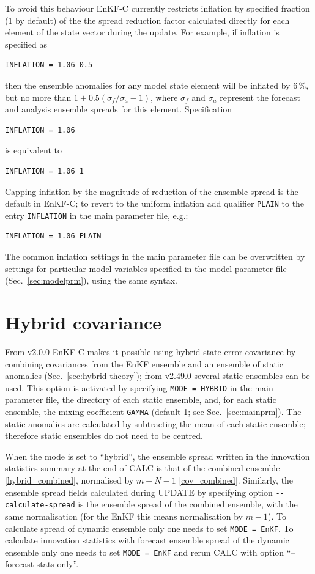 \documentclass[11pt]{report}
\begin{document}
To avoid this behaviour EnKF-C currently restricts inflation by specified fraction (1 by default) of the the spread reduction factor calculated directly for each element of the state vector during the update.
For example, if inflation is specified as
\begin{Verbatim}
INFLATION = 1.06 0.5
\end{Verbatim}
then the ensemble anomalies for any model state element will be inflated by 6\,\%, but no more than $1 + 0.5 (\sigma_f / \sigma_a - 1)$, where $\sigma_f$ and $\sigma_a$ represent the forecast and analysis ensemble spreads for this element.
Specification
\begin{Verbatim}
INFLATION = 1.06
\end{Verbatim}
is equivalent to
\begin{Verbatim}
INFLATION = 1.06 1
\end{Verbatim}
Capping inflation by the magnitude of reduction of the ensemble spread is the default in EnKF-C; to revert to the uniform inflation add qualifier \verb|PLAIN| to the entry \verb|INFLATION| in the main parameter file, e.g.:
\begin{Verbatim}
INFLATION = 1.06 PLAIN
\end{Verbatim}
The common inflation settings in the main parameter file can be overwritten by settings for particular model variables specified in the model parameter file (Sec.~\ref{sec:modelprm}), using the same syntax.

\section{Hybrid covariance}
\label{sec:hybrid-enkfc}

From v2.0.0 EnKF-C makes it possible using hybrid state error covariance by combining covariances from the EnKF ensemble and an ensemble of static anomalies (Sec.~\ref{sec:hybrid-theory}); from v2.49.0 several static ensembles can be used.
This option is activated by specifying \verb|MODE = HYBRID| in the main parameter file, the directory of each static ensemble, and, for each static ensemble, the mixing coefficient \verb|GAMMA| (default 1; see Sec.~\ref{sec:mainprm}).
The static anomalies are calculated by subtracting the mean of each static ensemble; therefore static ensembles do not need to be centred.

When the mode is set to ``hybrid'', the ensemble spread written in the innovation statistics summary at the end of CALC is that of the combined ensemble \eqref{hybrid_combined}, normalised by $m - N - 1$ \eqref{cov_combined}.
Similarly, the ensemble spread fields calculated during UPDATE by specifying option \verb|--calculate-spread| is the ensemble spread of the combined ensemble, with the same normalisation (for the EnKF this means normalisation by $m - 1$).
To calculate spread of dynamic ensemble only one needs to set \verb|MODE = EnKF|.
To calculate innovation statistics with forecast ensemble spread of the dynamic ensemble only one needs to set \verb|MODE = EnKF| and rerun CALC with option ``--forecast-stats-only''.
\end{document}

